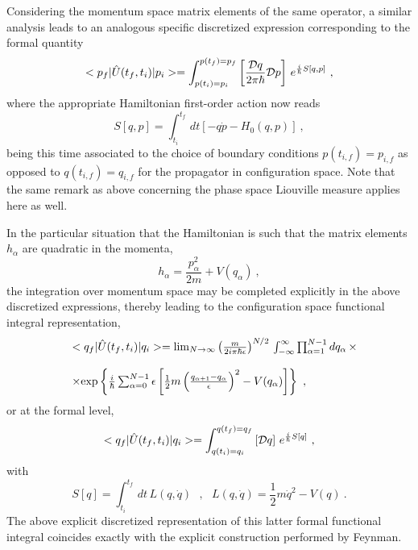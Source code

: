\documentclass[a4paper,11pt]{article}
\begin{document}
Considering the momentum space matrix elements of the same
operator, a similar analysis leads to an analogous specific discretized
expression corresponding to the formal quantity
\begin{equation}
<p_f|\hat{U}(t_f,t_i)|p_i>=
\int_{p(t_i)=p_i}^{p(t_f)=p_f}
\left[\frac{{\cal D}q}{2\pi\hbar}{\cal D}p\right]\,
e^{\frac{i}{\hbar}S[q,p]}\ ,
\label{eq:formalPI2}
\end{equation}
where the appropriate Hamiltonian first-order action now reads
\begin{equation}
S[q,p]=\int_{t_i}^{t_f}\,dt\left[-q\dot{p}-H_0(q,p)\right]\ ,
\end{equation}
being this time associated to the choice of boundary conditions
$p(t_{i,f})=p_{i,f}$ as opposed to $q(t_{i,f})=q_{i,f}$ for the
propagator in configuration space. Note that the same remark as above
concerning the phase space Liouville measure applies here as well.

In the particular situation that the Hamiltonian is such that the
matrix elements $h_\alpha$ are quadratic in the momenta,
\begin{equation}
h_\alpha=\frac{p^2_\alpha}{2m}+V(q_\alpha)\ ,
\end{equation}
the integration over momentum space may be completed explicitly
in the above discretized expressions, thereby leading to the configuration
space functional integral representation,
\begin{equation}
\begin{array}{r l}
&<q_f|\hat{U}(t_f,t_i)|q_i>=\lim_{N\rightarrow\infty}
\left(\frac{m}{2i\pi\hbar\epsilon}\right)^{N/2}\,
\int_{-\infty}^\infty\prod_{\alpha=1}^{N-1}dq_\alpha\,\times \\
 & \\
&\times{\rm exp}\left\{\frac{i}{\hbar}\sum_{\alpha=0}^{N-1}\epsilon
\left[\frac{1}{2}m\left(\frac{q_{\alpha+1}-q_\alpha}{\epsilon}\right)^2
-V(q_\alpha)\right]\right\}\ ,
\end{array}
\label{eq:PI2}
\end{equation}
or at the formal level,
\begin{equation}
<q_f|\hat{U}(t_f,t_i)|q_i>
=\int_{q(t_i)=q_i}^{q(t_f)=q_f}
\left[{\cal D}q\right]\,e^{\frac{i}{\hbar}S[q]}\ ,
\label{eq:formalPI3}
\end{equation}
with
\begin{equation}
S[q]=\int_{t_i}^{t_f}\,dt\,L(q,\dot{q})\ \ \ ,\ \ \ 
L(q,\dot{q})=\frac{1}{2}m\dot{q}^2-V(q)\ .
\end{equation}
The above explicit discretized representation of this latter formal functional 
integral coincides exactly with the explicit construction performed by 
Feynman.\cite{Feynman}
\end{document}

